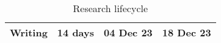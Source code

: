\begin{table}[h]
\begin{tabular}{ |l||c|c|c| }
    \hline
    \hline\rowcolor{gray!10}

    \textbf{Writing} & 14 days & 04 Dec 23 & 18 Dec 23 \\


    \hline
  \end{tabular}
  \caption{Research lifecycle}
  \label{fig:research_lifecycle}%
\end{table}
